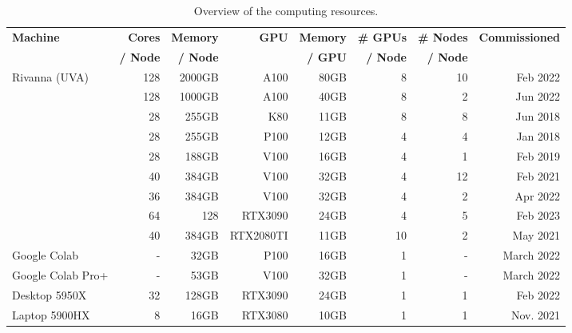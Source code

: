 \begin{table}
    \caption{Overview of the computing resources.}
    \label{tab:hwoverview}
    \begin{center}
    {\footnotesize
    \begin{tabular}{|l|r|r|r|r|r|r|r|}
        \hline
            {\bf Machine}  & {\bf Cores} & {\bf Memory} & {\bf GPU}   &   {\bf Memory} & {\bf \# GPUs} & {\bf \# Nodes}  & {\bf Commissioned} \\ 
                     &  {\bf / Node} & {\bf / Node}  &  & {\bf / GPU} & {\bf / Node}     &   {\bf / Node}        &  \\
        \hline
        \hline
        Rivanna (UVA)    & 128 & 2000GB   & A100 & 80GB &  8  & 10 & Feb 2022 \\
                        & 128 & 1000GB   & A100 & 40GB &  8  &  2 & Jun 2022  \\   
                        & 28  & 255GB    & K80  & 11GB &  8  &  8 & Jun 2018         \\
                        & 28  & 255GB    & P100 & 12GB &  4  &  4 & Jan 2018         \\
                        & 28  & 188GB    & V100 & 16GB &  4  &  1 & Feb 2019          \\
                        & 40  & 384GB    & V100 & 32GB &  4  & 12 & Feb 2021          \\
                        & 36  & 384GB    & V100 & 32GB &  4  &  2 & Apr 2022          \\
                        &  64 & 128     & RTX3090   & 24GB    & 4   &  5 & Feb 2023         \\
                        & 40  & 384GB    & RTX2080TI & 11GB & 10  &  2 & May 2021 \\                        
         \hline
         Google Colab      & -   & 32GB      & P100      & 16GB    & 1 & - & March 2022 \\
         Google Colab Pro+ & -   & 53GB      & V100      & 32GB    & 1 & - & March 2022 \\
         \hline
         Desktop 5950X     &  32 & 128GB     & RTX3090   & 24GB    & 1 & 1 & Feb 2022   \\
         \hline
         Laptop 5900HX     &   8 & 16GB      & RTX3080   & 10GB    & 1 & 1 & Nov. 2021 \\
         \hline
    \end{tabular}
    }
    \end{center}


\end{table}

